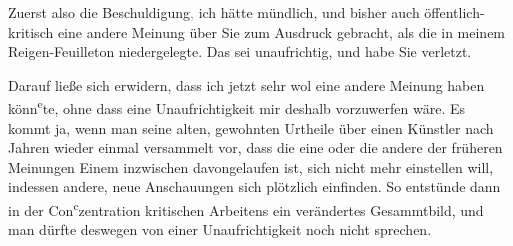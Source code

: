 \pstart
           Zuerst also die Beschuldigung\textcolor{gray}{,} ich hätte mündlich, und bisher auch
               öffentlich-kritisch eine andere Meinung über Sie zum Ausdruck gebracht, als die in
               meinem Reigen-Feuilleton
               niedergelegte. Das sei unaufrichtig, und habe Sie verletzt.\pend
           
\pstart
           Darauf ließe sich erwidern, dass ich jetzt sehr wol eine andere Meinung haben könn\substVorne{}\textsuperscript{e}\substDazwischen{}te\substHinten{}, ohne dass eine Unaufrichtigkeit mir deshalb vorzuwerfen wäre. Es kommt ja,
               wenn man seine alten, gewohnten Urtheile über einen Künstler nach Jahren wieder
               einmal versammelt \introOben{}vor\introOben{}, dass die eine oder die andere der
               früheren Meinungen Einem inzwischen davongelaufen ist, sich nicht mehr einstellen
               will, indessen andere, neue Anschauungen sich plötzlich einfinden. So entstünde dann
               in der Con\substVorne{}\textsuperscript{c}\substDazwischen{}z\substHinten{}entration kritischen Arbeitens ein verändertes Gesammtbild, und man dürfte
               deswegen von einer Unaufrichtigkeit noch nicht sprechen.\pend
           
